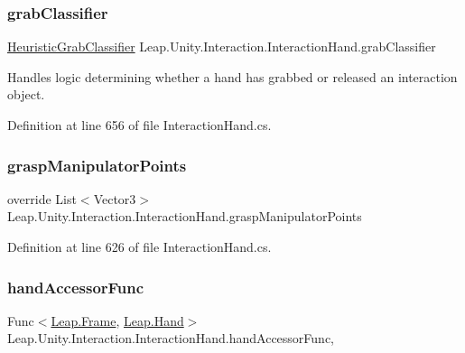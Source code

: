 \subsubsection{\texorpdfstring{grabClassifier}{grabClassifier}}
{\footnotesize\ttfamily \mbox{\hyperlink{class_leap_1_1_unity_1_1_interaction_1_1_internal_1_1_heuristic_grab_classifier}{Heuristic\+Grab\+Classifier}} Leap.\+Unity.\+Interaction.\+Interaction\+Hand.\+grab\+Classifier\hspace{0.3cm}{\ttfamily [get]}}



Handles logic determining whether a hand has grabbed or released an interaction object. 



Definition at line 656 of file Interaction\+Hand.\+cs.

\mbox{\label{class_leap_1_1_unity_1_1_interaction_1_1_interaction_hand_a2c6bb1acc1d651e8579ab86373e50d3e}} 
\subsubsection{\texorpdfstring{graspManipulatorPoints}{graspManipulatorPoints}}
{\footnotesize\ttfamily override List$<$Vector3$>$ Leap.\+Unity.\+Interaction.\+Interaction\+Hand.\+grasp\+Manipulator\+Points\hspace{0.3cm}{\ttfamily [get]}}



Definition at line 626 of file Interaction\+Hand.\+cs.

\mbox{\label{class_leap_1_1_unity_1_1_interaction_1_1_interaction_hand_a02fa026e8ea8ace2b826bbbfd10dd58f}} 
\subsubsection{\texorpdfstring{handAccessorFunc}{handAccessorFunc}}
{\footnotesize\ttfamily Func$<$\mbox{\hyperlink{class_leap_1_1_frame}{Leap.\+Frame}}, \mbox{\hyperlink{class_leap_1_1_hand}{Leap.\+Hand}}$>$ Leap.\+Unity.\+Interaction.\+Interaction\+Hand.\+hand\+Accessor\+Func\hspace{0.3cm}{\ttfamily [get]}, {\ttfamily [set]}}



